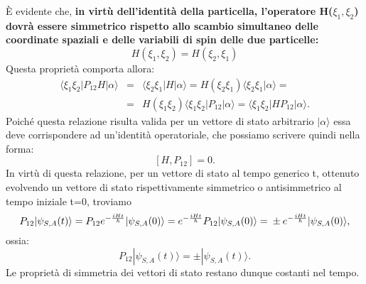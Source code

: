 \documentclass[a4paper,12pt,oneside]{book}
\begin{document}
È evidente che, \textbf{in virtù dell'identità della particella, l'operatore H($\xi_1, \xi_2$) dovrà essere simmetrico rispetto allo scambio simultaneo delle coordinate spaziali e delle variabili di spin delle due particelle:}
\begin{equation}
H(\xi_1, \xi_2)=H(\xi_2, \xi_1)
\end{equation}
Questa proprietà comporta allora:
\begin{eqnarray}
\langle \xi_1 \xi_2|P_{12}H|\alpha\rangle &=& \langle \xi_2 \xi_1|H|\alpha\rangle=H(\xi_2 \xi_1)\langle \xi_2 \xi_1|\alpha\rangle= \nonumber \\
&=& H(\xi_1 \xi_2)\langle \xi_1 \xi_2|P_{12}|\alpha\rangle=\langle \xi_1 \xi_2|HP_{12}|\alpha\rangle .
\end{eqnarray}
Poiché questa relazione risulta valida per un vettore di stato arbitrario $|\alpha\rangle$ essa deve corrispondere ad un'identità operatoriale, che possiamo scrivere quindi nella forma:
\begin{equation}
\left [ H, P_{12}\right ]=0 .
\end{equation}
In virtù di questa relazione, per un vettore di stato al tempo generico t, ottenuto evolvendo un vettore di stato rispettivamente simmetrico o antisimmetrico al tempo iniziale t=0, troviamo
\begin{equation}
P_{12}|\psi_{S,A}(t)\rangle= P_{12}e^{-\frac{iHt}{\hbar}}|\psi_{S,A}(0)\rangle=e^{
{-\frac{iHt}{\hbar}}
}P_{12}|\psi_{S,A}(0)\rangle=\\\pm e^{-\frac{iHt}{\hbar}}|\psi_{S,A}(0)\rangle ,
\end{equation}
ossia:
\begin{equation}
P_{12}|\psi_{S,A}(t)\rangle= \pm |\psi_{S,A}(t)\rangle .
\end{equation}
Le proprietà di simmetria dei vettori di stato restano dunque costanti nel tempo.
\end{document}
